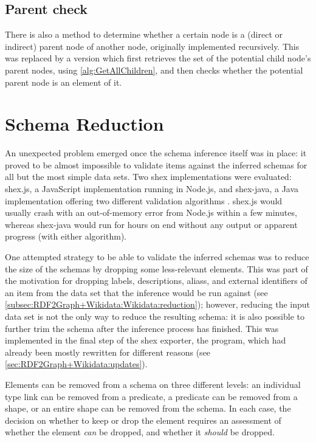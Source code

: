 \subsection{Parent check}
\label{subsec:RDF2Graph+Wikidata:cyclic-graph:IsParent}

There is also a method to determine whether a certain node is a (direct or indirect) parent node of another node,
originally implemented recursively.
This was replaced by a version which first retrieves the set of the potential child node’s parent nodes,
using \cref{alg:GetAllChildren},
and then checks whether the potential parent node is an element of it.

\section{Schema Reduction}
\label{sec:RDF2Graph+Wikidata:schema-reduction}

An unexpected problem emerged once the \gls{schema} inference itself was in place:
it proved to be almost impossible to validate \glspl{item} against the inferred \glspl{schema}
for all but the most simple data sets.
Two \gls{shex} implementations were evaluated:
\gls{shex.js},
a \gls{JavaScript} implementation running in \gls{Node.js},
and \gls{shex-java},
a \gls{Java} implementation offering two different validation algorithms \cite{boneva:hal-01590350}.
\gls{shex.js} would usually crash with an out-of-memory error from \gls{Node.js} within a few minutes,
whereas \gls{shex-java} would run for hours on end without any output or apparent progress
(with either algorithm).

One attempted strategy to be able to validate the inferred \glspl{schema}
was to reduce the size of the \glspl{schema} by dropping some less-relevant elements.
This was part of the motivation for dropping \glspl{label}, \glspl{description}, \glspl{alias}, and external identifiers of an \gls{item}
from the data set that the inference would be run against
(see \cref{subsec:RDF2Graph+Wikidata:Wikidata:reduction});
however, reducing the input data set is not the only way to reduce the resulting \gls{schema}:
it is also possible to further trim the \gls{schema} after the inference process has finished.
This was implemented in the final step of the \gls{shex} exporter,
the  program,
which had already been mostly rewritten for different reasons
(see \cref{sec:RDF2Graph+Wikidata:updates}).

Elements can be removed from a \gls{schema} on three different levels:
an individual \gls{type link} can be removed from a \gls{predicate},
a \gls{predicate} can be removed from a \gls{shape},
or an entire \gls{shape} can be removed from the \gls{schema}.
In each case, the decision on whether to keep or drop the element
requires an assessment of whether the element \emph{can} be dropped,
and whether it \emph{should} be dropped.

